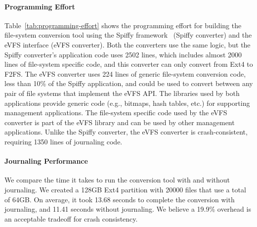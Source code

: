 \vspace{-0.25em}
\paragraph{Programming Effort} Table~\ref{tab:programming-effort} shows the programming effort for building the file-system conversion tool using the Spiffy framework~\cite{sun2018spiffy} (Spiffy converter) and the eVFS interface (eVFS converter). Both the converters use the same logic, but the Spiffy converter's application code uses 2502 lines, which includes almost 2000 lines of file-system specific code, and this converter can only convert from Ext4 to F2FS. The eVFS converter uses 224 lines of generic file-system conversion code, less than 10\% of the Spiffy application, and could be used to convert between any pair of file systems that implement the eVFS API. The libraries used by both applications provide generic code (e.g., bitmaps, hash tables, etc.) for supporting management applications. The file-system specific code used by the eVFS converter is part of the eVFS library and can be used by other management applications. Unlike the Spiffy converter, the eVFS converter is crash-consistent, requiring 1350 lines of journaling code.
  
\vspace{-0.25em}
\paragraph{Journaling Performance} We compare the time it takes to run the conversion tool with and without journaling. We created a 128GB Ext4 partition with 20000 files that use a total of 64GB. On average, it took 13.68 seconds to complete the conversion with journaling, and 11.41 seconds without journaling. We believe a 19.9\% overhead is an acceptable tradeoff for crash consistency.


